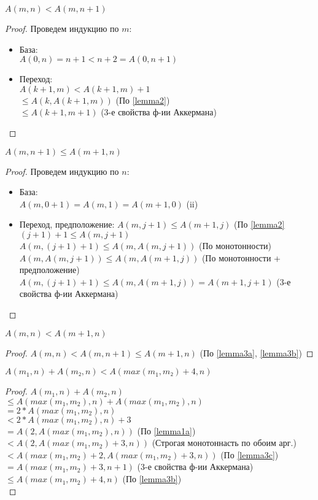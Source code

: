 \begin{lemma}
$A(m, n) < A(m, n + 1)$
\end{lemma}
\label{lemma3a}
\begin{proof}
Проведем индукцию по $m$:
\begin{itemize}
\item База:\\
$A(0, n) = n + 1 < n + 2 = A(0, n + 1)$
\item Переход:\\
$A(k + 1, m) < A(k + 1, m) + 1$\\
$\leq A(k, A(k + 1, m))$ (По \ref{lemma2})\\
$\leq A(k + 1, m + 1)$   (3-е свойства ф-ии Аккермана)
\end{itemize}
\end{proof}
\begin{lemma}
$A(m, n + 1) \leq A(m + 1, n)$
\end{lemma}
\label{lemma3b}
\begin{proof}
Проведем индукцию по $n$:
\begin{itemize}
\item База:\\
$A(m, 0 + 1) = A(m, 1) = A(m + 1, 0)$ (ii)
\item Переход, предположение: $A(m, j + 1) \leq A(m + 1, j)$ (По \ref{lemma2}\\
$(j + 1) + 1 \leq A(m, j + 1)$\\
$A(m, (j + 1) + 1) \leq A(m, A(m, j + 1))$ (По монотонности)\\
$A(m, A(m, j + 1)) \leq A(m, A(m + 1, j))$ (По монотонности + предположение)\\
$A(m, (j + 1) + 1) \leq A(m, A(m + 1, j)) = A(m + 1, j + 1)$ (3-е свойства ф-ии Аккермана)
\end{itemize}
\end{proof}
\begin{lemma}
$A(m, n) < A(m + 1, n)$
\end{lemma}
\label{lemma3c}
\begin{proof}
$A(m, n) < A(m, n + 1) \leq A(m + 1, n)$ (По \ref{lemma3a}, \ref{lemma3b})
\end{proof}
\begin{lemma}
$A(m_1, n) + A(m₂, n) < A(max(m_1, m₂) + 4, n)$
\end{lemma}
\label{lemma4}
\begin{proof}
$A(m_1, n) + A(m_2, n)$\\
$≤ A(max(m_1, m_2), n) + A(max(m_1, m_2), n)$\\
$= 2 * A(max(m_1, m_2), n)$\\
$< 2 * A(max(m_1, m_2), n) + 3$\\
$= A(2, A(max(m_1, m_2), n))$ (По \ref{lemma1a})\\
$< A(2, A(max(m_1, m_2) + 3, n))$ (Строгая монотоннасть по обоим арг.)\\
$< A(max(m_1, m_2) + 2, A(max(m_1, m_2) + 3, n))$ (По \ref{lemma3c})\\
$= A(max(m_1, m_2) + 3, n + 1)$   (3-е свойства ф-ии Аккермана)\\
$≤ A(max(m_1, m_2) + 4, n)$ (По \ref{lemma3b})\\
\end{proof}
